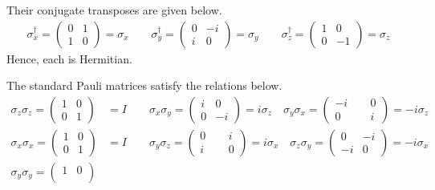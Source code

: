 Their conjugate transposes are given below.
\begin{align*}
	\sigma_x^\dagger =
	\begin{pmatrix}
		0 & 1 \\
		1 & 0
	\end{pmatrix}
	= \sigma_x
	\qquad
	\sigma_y^\dagger =
	\begin{pmatrix}
		0 & -i \\
		i & 0
	\end{pmatrix}
	= \sigma_y
	\qquad
	\sigma_z^\dagger =
	\begin{pmatrix}
		1 & 0  \\
		0 & -1
	\end{pmatrix}
	= \sigma_z
\end{align*}
Hence, each is Hermitian.

\begin{remark}\label{rem:Pauli}
	The standard Pauli matrices satisfy the relations below.
	\begin{align*}
		\sigma_z \sigma_z =
		\begin{pmatrix}
			1 & 0 \\
			0 & 1
		\end{pmatrix}
		 & = I \qquad
		\sigma_x \sigma_y =
		\begin{pmatrix}
			i & 0  \\
			0 & -i
		\end{pmatrix}
		= i \sigma_z
		\quad
		\sigma_y \sigma_x =
		\begin{pmatrix}
			-i & \phantom{+} 0 \\
			0  & \phantom{+} i
		\end{pmatrix}
		= -i \sigma_z  \\
		\sigma_x \sigma_x =
		\begin{pmatrix}
			1 & 0 \\
			0 & 1
		\end{pmatrix}
		 & = I \qquad
		\sigma_y \sigma_z =
		\begin{pmatrix}
			0 & \phantom{+} i \\
			i & \phantom{+} 0
		\end{pmatrix}
		= i \sigma_x
		\quad
		\sigma_z \sigma_y =
		\begin{pmatrix}
			0  & -i \\
			-i & 0
		\end{pmatrix}
		= - i \sigma_x \\
		\sigma_y \sigma_y =
		\begin{pmatrix}
			1 & 0 \\

\end{pmatrix}
\end{align*}
\end{remark}

